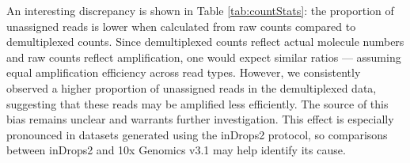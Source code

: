 An interesting discrepancy is shown in Table \ref{tab:countStats}:
the proportion of unassigned reads is lower when calculated from raw counts compared to demultiplexed counts.
Since demultiplexed counts reflect actual molecule numbers and raw counts reflect amplification,
one would expect similar ratios — assuming equal amplification efficiency across read types.
However, we consistently observed a higher proportion of unassigned reads in the demultiplexed data,
suggesting that these reads may be amplified less efficiently.
The source of this bias remains unclear and warrants further investigation.
This effect is especially pronounced in datasets generated using the inDrops2 protocol,
so comparisons between inDrops2 and 10x Genomics v3.1 may help identify its cause.
